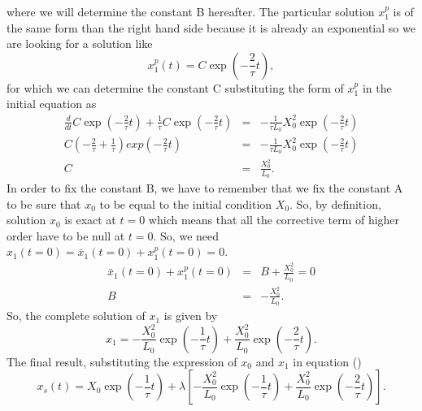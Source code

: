 \documentclass[a4paper,10pt]{article}
\begin{document}
where we will determine the constant B hereafter. The particular solution  $x_1^p$ is of the same form than the right hand side because it is already an exponential so we are looking for a solution like
\begin{equation}
 x_1^p(t) = C\exp\left(-\frac{2}{\tau}t\right),
\end{equation}
for which we can determine the constant C substituting the form of $x_1^p$ in the initial equation as
\begin{eqnarray}
\frac{d}{dt}C\exp\left(-\frac{2}{\tau}t\right)  + \frac{1}{\tau}C\exp\left(-\frac{2}{\tau}t\right)&=& -\frac{1}{\tau L_0}X_0^2\exp\left(-\frac{2}{\tau}t\right)\\
C\left( -\frac{2}{\tau} + \frac{1}{\tau}  \right) exp\left(-\frac{2}{\tau}t\right) &=&- \frac{1}{\tau L_0}X_0^2\exp\left(-\frac{2}{\tau}t\right)\\
C &=& \frac{X_0^2}{L_0}.
\end{eqnarray}
In order to fix the constant B, we have to remember that we fix the constant A to be sure that $x_0$ to be equal to the initial condition $X_0$. So, by definition, solution $x_0$ is exact at $t=0$ which means that all the corrective term of higher order have to be null at $t=0$. So, we need $x_1(t=0) = \bar{x}_1(t=0) + x_1^p(t=0) = 0$.
\begin{eqnarray}
\bar{x}_1(t=0) + x_1^p(t=0) &=& B +  \frac{X_0^2}{L_0} = 0\\
B &=& - \frac{X_0^2}{L_0}.
\end{eqnarray}
So, the complete solution of $x_1$ is given by
\begin{equation}
x_1 = -\frac{X_0^2}{L_0} \exp\left(-\frac{1}{\tau}t\right) + \frac{X_0^2}{L_0} \exp\left(-\frac{2}{\tau}t\right).
\end{equation}
The final result, substituting the expression of $x_0$ and $x_1$ in equation ()
\begin{equation}
x_s(t) = X_0\exp\left(-\frac{1}{\tau}t\right) +\lambda\left[-\frac{X_0^2}{L_0} \exp\left(-\frac{1}{\tau}t\right) + \frac{X_0^2}{L_0} \exp\left(-\frac{2}{\tau}t\right)\right].
\end{equation}
\end{document}
